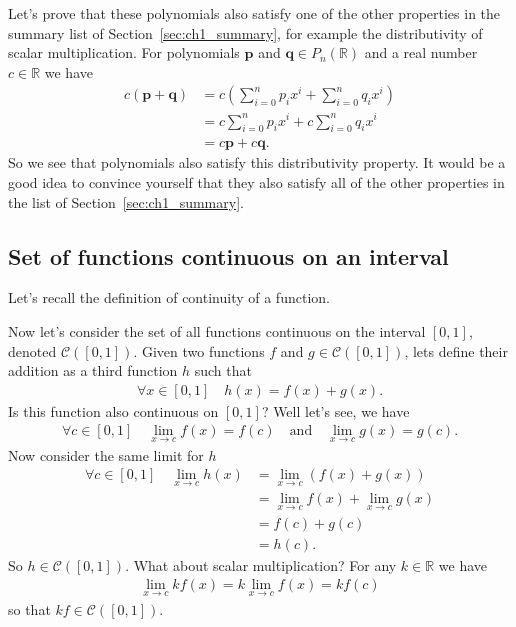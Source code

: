 Let's prove that these polynomials also satisfy one of the other properties in the summary list of Section~\ref{sec:ch1_summary}, for example the distributivity of scalar multiplication. For polynomials $\mathbf{p}$ and $\mathbf{q}\in P_n(\mathbb{R})$ and a real number $c\in\mathbb{R}$ we have
\begin{align*}
c (\mathbf{p}+\mathbf{q}) &= c\left( \sum_{i=0}^n p_i x^i + \sum_{i=0}^n q_i x^i \right) \\
&= c\sum_{i=0}^n p_i x^i + c\sum_{i=0}^n q_i x^i \\
&= c \mathbf{p}+ c\mathbf{q}.
\end{align*}
So we see that polynomials also satisfy this distributivity property. It would be a good idea to convince yourself that they also satisfy all of the other properties in the list of Section~\ref{sec:ch1_summary}.


\subsection*{Set of functions continuous on an interval}

Let's recall the definition of continuity of a function.


\indent Now let's consider the set of all functions continuous on the interval $[0,1]$, denoted $\mathcal{C}([0,1])$. Given two functions $f$ and $g\in\mathcal{C}([0,1])$, lets define their addition as a third function $h$ such that
\begin{align*}
\forall x\in[0,1] \quad h(x) = f(x) + g(x).
\end{align*}
Is this function also continuous on $[0,1]$? Well let's see, we have
\begin{align*}
\forall c\in [0,1] \quad \lim_{x \to c} f(x) = f(c) \quad \text{and} \quad \lim_{x \to c} g(x) = g(c).
\end{align*}
Now consider the same limit for $h$
\begin{align*}
\forall c\in [0,1] \quad \lim_{x \to c} h(x) &= \lim_{x \to c} \left(f(x) + g(x)\right) \\
&= \lim_{x \to c} f(x) + \lim_{x \to c}  g(x) \\
&= f(c) + g(c) \\
&= h(c).
\end{align*}
So $h\in\mathcal{C}([0,1])$. What about scalar multiplication? For any $k\in\mathbb{R}$ we have
\begin{align*}
\lim_{x \to c} k f(x) = k \lim_{x \to c}  f(x) = k f(c)
\end{align*}
so that $kf\in\mathcal{C}([0,1])$. 

